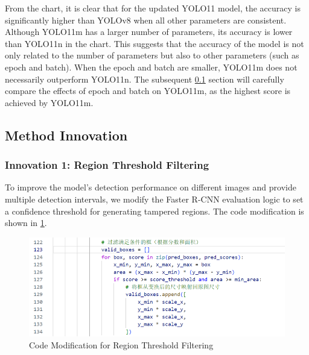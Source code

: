 From the chart, it is clear that for the updated YOLO11 model, the accuracy is significantly higher than YOLOv8 when all other parameters are consistent. Although YOLO11m has a larger number of parameters, its accuracy is lower than YOLO11n in the chart. This suggests that the accuracy of the model is not only related to the number of parameters but also to other parameters (such as epoch and batch). When the epoch and batch are smaller, YOLO11m does not necessarily outperform YOLO11n. The subsequent \cref{subsec:create} section will carefully compare the effects of epoch and batch on YOLO11m, as the highest score is achieved by YOLO11m.

\subsection{Method Innovation}
\label{subsec:create}
\subsubsection{Innovation 1: Region Threshold Filtering}
To improve the model's detection performance on different images and provide multiple detection intervals, we modify the Faster R-CNN evaluation logic to set a confidence threshold for generating tampered regions. The code modification is shown in \cref{fig:faster-r-cnn-conf-code}.
\begin{figure}[t]
  \centering
  \includegraphics[width=0.8\linewidth]{./graphs/图片4.png}

  \caption{Code Modification for Region Threshold Filtering}
  \label{fig:faster-r-cnn-conf-code}
\end{figure}


